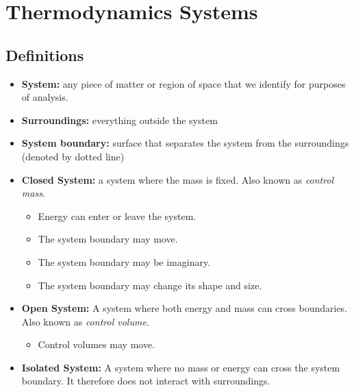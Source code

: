 \section{Thermodynamics Systems}
\subsection{Definitions}
\begin{itemize}
    \item \textbf{System:} any piece of matter or region of space that we identify for purposes of analysis.
    \item \textbf{Surroundings:} everything outside the system
    \item \textbf{System boundary:} surface that separates the system from the surroundings (denoted by dotted line)
    \item \textbf{Closed System:} a system where the mass is fixed. Also known as \textit{control mass}.
    \begin{itemize}
        \item Energy can enter or leave the system.
        \item The system boundary may move.
        \item The system boundary may be imaginary.
        \item The system boundary may change its shape and size.
    \end{itemize}
    \item \textbf{Open System:} A system where both energy and mass can cross boundaries. Also known as \textit{control volume}.
    \begin{itemize}
        \item Control volumes may move.
    \end{itemize}
    \item \textbf{Isolated System:} A system where no mass or energy can cross the system boundary. It therefore does not interact with surroundings.
\end{itemize}
